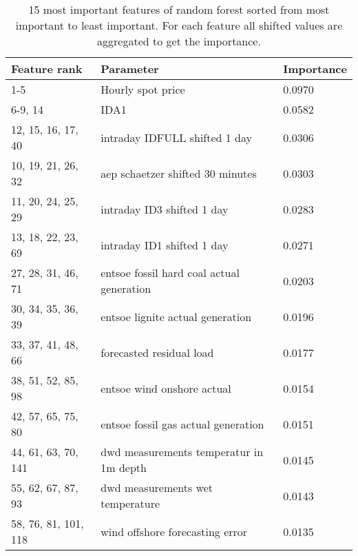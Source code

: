 \documentclass[class=scrbook, crop=false]{standalone}
\begin{document}
\begin{table}[]
\centering
\begin{tabular}{l|l|l}
 Feature rank & Parameter & Importance \\\hline
 1-5 & Hourly spot price& 0.0970\\
 6-9, 14& IDA1&0.0582 \\
 12, 15, 16, 17, 40&intraday IDFULL shifted 1 day & 0.0306 \\
 10, 19, 21, 26, 32  &aep schaetzer shifted 30 minutes&0.0303\\
 11, 20, 24, 25, 29 &intraday ID3 shifted 1 day &0.0283\\
 13, 18, 22, 23, 69 & intraday ID1 shifted 1 day &0.0271\\
 27, 28, 31, 46, 71 & entsoe fossil hard coal actual generation & 0.0203\\
 30, 34, 35, 36, 39 & entsoe lignite actual generation & 0.0196 \\
 33, 37, 41, 48, 66 & forecasted residual load & 0.0177 \\
 38, 51, 52, 85, 98 & entsoe wind onshore actual & 0.0154 \\
42, 57, 65, 75, 80 & entsoe fossil gas actual generation & 0.0151 \\
44, 61, 63, 70, 141 & dwd measurements temperatur in 1m depth & 0.0145 \\
55, 62, 67, 87, 93 & dwd measurements wet temperature & 0.0143 \\
58, 76, 81, 101, 118 & wind offshore forecasting error & 0.0135 \\
 
\end{tabular}
\caption{15 most important features of random forest sorted from most important to least important. For each feature all shifted values are aggregated to get the importance.}
\label{Table::Feature_importance}
\end{table}
\end{document}
